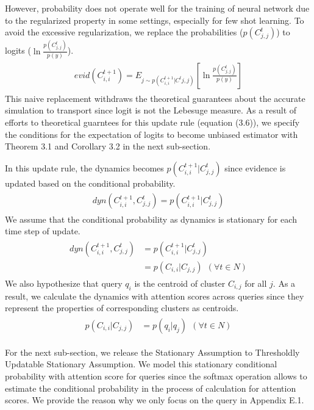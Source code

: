 However, probability does not operate well for the training of neural network due to the regularized property in some settings, 
especially for few shot learning.
To avoid the excessive regularization, 
we replace the probabilities ($p(C^t_{j,j})$) to logits ($\ln{\frac{p(C^t_{j,j})}{p(y)}}$).
\begin{align}
\label{evidence_for_logits}
\begin{split}
evid(C^{t+1}_{i,i})=E_{j\sim p(C^{t+1}_{i,i}|C^t{j,j})}[\ln{\frac{p(C^t_{j,j})}{p(y)}}]
\end{split}
\end{align}
This naive replacement withdraws the theoretical guarantees about the accurate simulation to transport 
since logit is not the Lebesuge measure.
As a result of efforts to theoretical guarntees for this update rule (equation (3.6)), 
we specify the conditions for the expectation of logits to become unbiased estimator with Theorem 3.1 and Corollary 3.2 in the next sub-section.

In this update rule, the dynamics becomes $p(C^{t+1}_{i,i}|C^t_{j,j})$ since evidence is updated 
based on the conditional probability.
\begin{align}
\label{orig_dynamics}
\begin{split}
dyn(C^{t+1}_{i,i},C^t_{j,j})=p(C^{t+1}_{i,i}|C^t_{j,j})
\end{split}
\end{align}
We assume that the conditional probability as dynamics is stationary for each time step of update.
\begin{align}
\label{stationary_dynamics}
\begin{split}
dyn(C^{t+1}_{i,i},C^t_{j,j})&=p(C^{t+1}_{i,i}|C^t_{j,j})\\
                          &=p(C_{i,i}|C_{j,j})\ \ (\forall t \in N)
\end{split}
\end{align}
We also hypothesize that query $q_i$ is the centroid of cluster $C_{i,j}$ for all $j$.
As a result, we calculate the dynamics with attention scores across queries
since they represent the properties of corresponding clusters as centroids. 
\begin{align}
\label{dynamics_impl}
\begin{split}
p(C_{i,i}|C_{j,j})&=p(q_{i}|q_{j})\ \ (\forall t \in N)
\end{split}
\end{align}

For the next sub-section, we release the Stationary Assumption to Thresholdly Updatable Stationary Assumption. 
We model this stationary conditional probability with attention score for queries
since the softmax operation allows to estimate the conditional probability in the process of calculation for attention scores.
We provide the reason why we only focus on the query in Appendix E.1.


